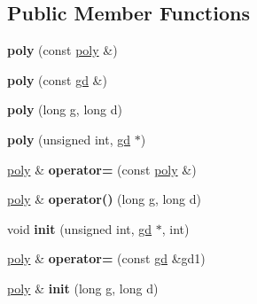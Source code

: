 \subsection*{Public Member Functions}
\begin{DoxyCompactItemize}
\item 
\mbox{\label{classmmgd_1_1poly_aeda6ade4af424598ef30767c990a6dea}} 
{\bfseries poly} (const \mbox{\hyperlink{classmmgd_1_1poly}{poly}} \&)
\item 
\mbox{\label{classmmgd_1_1poly_ad382086366b79f689dbd7928ecdfdbb5}} 
{\bfseries poly} (const \mbox{\hyperlink{classmmgd_1_1gd}{gd}} \&)
\item 
\mbox{\label{classmmgd_1_1poly_a133a3b2591c6b3a15a4d4fe03ef3599c}} 
{\bfseries poly} (long g, long d)
\item 
\mbox{\label{classmmgd_1_1poly_a06487929da588e96a1f63503bad5cd9d}} 
{\bfseries poly} (unsigned int, \mbox{\hyperlink{classmmgd_1_1gd}{gd}} $\ast$)
\item 
\mbox{\label{classmmgd_1_1poly_ac9ae9acd1a5d97c73856ff68aaa8f509}} 
\mbox{\hyperlink{classmmgd_1_1poly}{poly}} \& {\bfseries operator=} (const \mbox{\hyperlink{classmmgd_1_1poly}{poly}} \&)
\item 
\mbox{\label{classmmgd_1_1poly_a593698e5f78e7aa64a143c85c35333f9}} 
\mbox{\hyperlink{classmmgd_1_1poly}{poly}} \& {\bfseries operator()} (long g, long d)
\item 
\mbox{\label{classmmgd_1_1poly_a5d092e747d276a8f38461a0b7d459759}} 
void {\bfseries init} (unsigned int, \mbox{\hyperlink{classmmgd_1_1gd}{gd}} $\ast$, int)
\item 
\mbox{\label{classmmgd_1_1poly_aec0dc14f9919d62e2223afb9844d1f08}} 
\mbox{\hyperlink{classmmgd_1_1poly}{poly}} \& {\bfseries operator=} (const \mbox{\hyperlink{classmmgd_1_1gd}{gd}} \&gd1)
\item 
\mbox{\label{classmmgd_1_1poly_a5bd23732151750b7e29789f6e17b9f6b}} 
\mbox{\hyperlink{classmmgd_1_1poly}{poly}} \& {\bfseries init} (long g, long d)

\end{DoxyCompactItemize}
